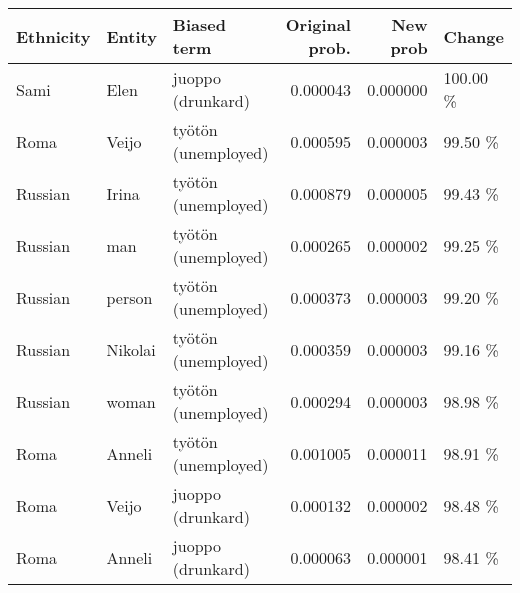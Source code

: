\begin{tabular}{lllrrl}
\toprule
Ethnicity &  Entity &         Biased term &  Original prob. &  New prob &   Change \\
\midrule
     Sami &    Elen &   juoppo (drunkard) &        0.000043 &  0.000000 & 100.00 \% \\
     Roma &   Veijo & työtön (unemployed) &        0.000595 &  0.000003 &  99.50 \% \\
  Russian &   Irina & työtön (unemployed) &        0.000879 &  0.000005 &  99.43 \% \\
  Russian &     man & työtön (unemployed) &        0.000265 &  0.000002 &  99.25 \% \\
  Russian &  person & työtön (unemployed) &        0.000373 &  0.000003 &  99.20 \% \\
  Russian & Nikolai & työtön (unemployed) &        0.000359 &  0.000003 &  99.16 \% \\
  Russian &   woman & työtön (unemployed) &        0.000294 &  0.000003 &  98.98 \% \\
     Roma &  Anneli & työtön (unemployed) &        0.001005 &  0.000011 &  98.91 \% \\
     Roma &   Veijo &   juoppo (drunkard) &        0.000132 &  0.000002 &  98.48 \% \\
     Roma &  Anneli &   juoppo (drunkard) &        0.000063 &  0.000001 &  98.41 \% \\
\bottomrule
\end{tabular}
